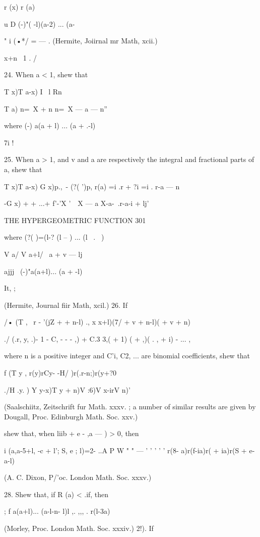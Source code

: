 r (x) r (a)

u D (-)"( -l)(a-2) ... (a-%

" i (•*/ = — . (Hermite, Joiirnal mr Math, xcii.)

x+n \ 1 . /

24. When a < 1, shew that

T x)T a-x) I \ l Rn

T a) n=\ X + n n=\ X — a — n''

where (-) a(a + l) ... (a + .-l)

7i !

25. When a > 1, and v and a are respectively the integral and
fractional parts of a, shew that

T x)T a-x) G x)p.,\ - (?( ')p, r(a) =i .r + ?i =i . r-a — n

-G x) + + ...+ f'-'X '\ \ X — a X-a-\ .r-a-i + lj'

THE HYPERGEOMETRIC FUNCTION 301

where (?( )=(l-? (l -- ) ... (l \ . \ )

V a/ V a+l/ \ a + v — lj

ajjj \ (-)"a(a+l)... (a + -l)

It, ;

(Hermite, Journal fiir Math, xcil.) 26. If

/• (T , \ r - '(jZ + + n-l) ., x x+l)(7/ + v + n-l)( + v + n)

./ (.r, y, .)- 1 - C, - - - ,) + C.3 3,( + 1) ( + ,)( . , + i) - ... ,

where n is a positive integer and C'i, C2, ... are binomial
coefficients, shew that

f (T y , r(y)rCy- -H/ )r(.r-n;)r(y+?0

./H .y. ) Y y-x)T y + n)V :6)V x-irV n)'

(Saalschiitz, Zeitschrift fur Math. xxxv. ; a number of similar
results are given by Dougall, Proc. Edinburgh Math. Soc. xxv.)

shew that, when liib + e - ,a — ) > 0, then

i (a,a-5+l, -c + l'; S, e ; l)=2- ..A P W " " — ' ' ' ' ' r(8-
a)r(f-ia)r( + ia)r(S + e-a-l)

(A. C. Dixon, P/'oc. London Math. Soc. xxxv.)

28. Shew that, if R (a) < .if, then

; f a(a+l)... (a-l-n- l)l ,. ,,, . r(l-3a)

(Morley, Proc. London Math. Soc. xxxiv.) 2!). If

